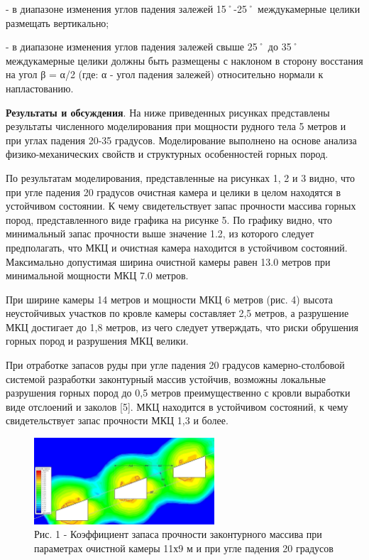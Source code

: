 \begin{multicols}{2}
- в диапазоне изменения углов падения залежей 15˚-25˚ междукамерные
целики размещать вертикально;

- в диапазоне изменения углов падения залежей свыше 25˚ до 35˚
междукамерные целики должны быть размещены с наклоном в сторону
восстания на угол β = α/2 (где: α - угол падения залежей) относительно
нормали к напластованию.

{\bfseries Результаты и обсуждения}. На ниже приведенных рисунках
представлены результаты численного моделирования при мощности рудного
тела 5 метров и при углах падения 20-35 градусов. Моделирование
выполнено на основе анализа физико-механических свойств и структурных
особенностей горных пород.

По результатам моделирования, представленные на рисунках 1, 2 и 3 видно,
что при угле падения 20 градусов очистная камера и целики в целом
находятся в устойчивом состоянии. К чему свидетельствует запас прочности
массива горных пород, представленного виде графика на рисунке 5. По
графику видно, что минимальный запас прочности выше значение 1.2, из
которого следует предполагать, что МКЦ и очистная камера находится в
устойчивом состояний. Максимально допустимая ширина очистной камеры
равен 13.0 метров при минимальной мощности МКЦ 7.0 метров.

При ширине камеры 14 метров и мощности МКЦ 6 метров (рис. 4) высота
неустойчивых участков по кровле камеры составляет 2,5 метров, а
разрушение МКЦ достигает до 1,8 метров, из чего следует утверждать, что
риски обрушения горных пород и разрушения МКЦ велики.

При отработке запасов руды при угле падения 20 градусов
камерно-столбовой системой разработки законтурный массив устойчив,
возможны локальные разрушения горных пород до 0,5 метров преимущественно
с кровли выработки виде отслоений и заколов {[}5{]}. МКЦ находится в
устойчивом состояний, к чему свидетельствует запас прочности МКЦ 1,3 и
более.
\end{multicols}

\begin{figure}[H]
	\centering
	\includegraphics[width=0.6\textwidth]{assets/282}
	\caption*{}
    \caption*{ Рис. 1 - Коэффициент запаса прочности законтурного массива при параметрах очистной камеры 11х9 м и при угле падения 20 градусов}
\end{figure}

